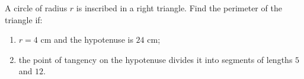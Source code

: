 A circle of radius $r$ is inscribed in a right triangle. Find the perimeter of the triangle if:
\begin{enumerate}
\item[(a)] $r=4$ cm and the hypotenuse is $24$ cm;
\item[(b)] the point of tangency on the hypotenuse divides it into segments of lengths $5$ and $12$.
\end{enumerate}
